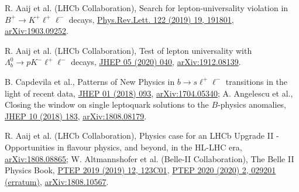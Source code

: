 \documentclass[a4paper,11pt]{article}
\begin{document}
\begin{thebibliography}{99}
R. Aaij et al. (LHCb Collaboration),
Search for lepton-universality violation in $B^+\to K^+\ell^+\ell^-$ decays,
\href{https://doi.org/10.1103/PhysRevLett.122.191801}{Phys.Rev.Lett. 122 (2019) 19, 191801},
\href{http://arxiv.org/abs/arXiv:1903.09252}{arXiv:1903.09252}.

R. Aaij et al. (LHCb Collaboration),
Test of lepton universality with $ {\Lambda}_b^0\to {pK}^{-}{\mathrm{\ell}}^{+}{\mathrm{\ell}}^{-} $ decays,
\href{https://doi.org/10.1007/JHEP05(2020)040}{JHEP 05 (2020) 040},
\href{http://arxiv.org/abs/arXiv:1912.08139}{arXiv:1912.08139}.

B. Capdevila et al.,
Patterns of New Physics in $b\to s\ell^+\ell^-$ transitions in the light of recent data,
\href{https://doi.org/10.1007/JHEP01(2018)093}{JHEP 01 (2018) 093},
\href{http://arxiv.org/abs/arXiv:1704.05340}{arXiv:1704.05340};
A. Angelescu et al.,
Closing the window on single leptoquark solutions to the $B$-physics anomalies,
\href{https://doi.org/10.1007/JHEP10(2018)183}{JHEP 10 (2018) 183},
\href{http://arxiv.org/abs/arXiv:1808.08179}{arXiv:1808.08179}.

R. Aaij et al. (LHCb Collaboration),
Physics case for an LHCb Upgrade II - Opportunities in flavour physics, and beyond, in the HL-LHC era,
\href{http://arxiv.org/abs/arXiv:1808.08865}{arXiv:1808.08865};
W. Altmannshofer et al. (Belle-II Collaboration),
The Belle II Physics Book,
\href{https://doi.org/10.1093/ptep/ptz106}{PTEP 2019 (2019) 12, 123C01},
\href{https://doi.org/10.1093/ptep/ptaa008}{PTEP 2020 (2020) 2, 029201 (erratum)},
\href{http://arxiv.org/abs/arXiv:1808.10567}{arXiv:1808.10567}.

\end{thebibliography}
\end{document}
